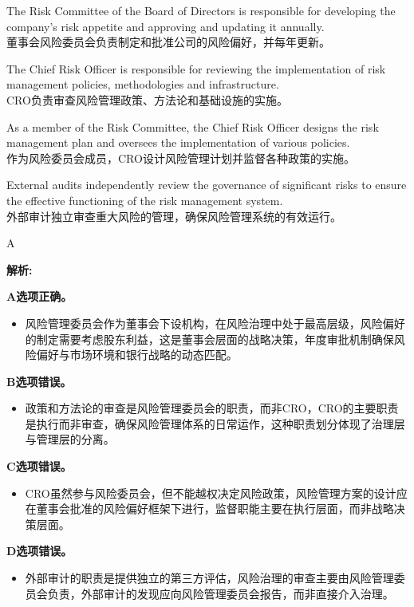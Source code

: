 \documentclass{article}
\newenvironment{explanation}
{\textbf{解析:}\par}
{\par}
\begin{document}
    \begin{choices}
        \item The Risk Committee of the Board of Directors is responsible for developing the company's risk appetite and approving and updating it annually.\\
        董事会风险委员会负责制定和批准公司的风险偏好，并每年更新。
        \item The Chief Risk Officer is responsible for reviewing the implementation of risk management policies, methodologies and infrastructure.\\
        CRO负责审查风险管理政策、方法论和基础设施的实施。
        \item As a member of the Risk Committee, the Chief Risk Officer designs the risk management plan and oversees the implementation of various policies.\\
        作为风险委员会成员，CRO设计风险管理计划并监督各种政策的实施。
        \item External audits independently review the governance of significant risks to ensure the effective functioning of the risk management system.\\
        外部审计独立审查重大风险的管理，确保风险管理系统的有效运行。
    \end{choices}
    
    \begin{correctanswer}
    A
    \end{correctanswer}
    
    \begin{explanation}
        \textbf{A选项正确。}
        \begin{itemize}
            \item 风险管理委员会作为董事会下设机构，在风险治理中处于最高层级，风险偏好的制定需要考虑股东利益，这是董事会层面的战略决策，年度审批机制确保风险偏好与市场环境和银行战略的动态匹配。
        \end{itemize}
        
        \textbf{B选项错误。}
        \begin{itemize}
            \item 政策和方法论的审查是风险管理委员会的职责，而非CRO，CRO的主要职责是执行而非审查，确保风险管理体系的日常运作，这种职责划分体现了治理层与管理层的分离。
        \end{itemize}
        
        \textbf{C选项错误。}
        \begin{itemize}
            \item CRO虽然参与风险委员会，但不能越权决定风险政策，风险管理方案的设计应在董事会批准的风险偏好框架下进行，监督职能主要在执行层面，而非战略决策层面。
        \end{itemize}
        
        \textbf{D选项错误。}
        \begin{itemize}
            \item 外部审计的职责是提供独立的第三方评估，风险治理的审查主要由风险管理委员会负责，外部审计的发现应向风险管理委员会报告，而非直接介入治理。
        \end{itemize}
    \end{explanation}
    
\end{document}
